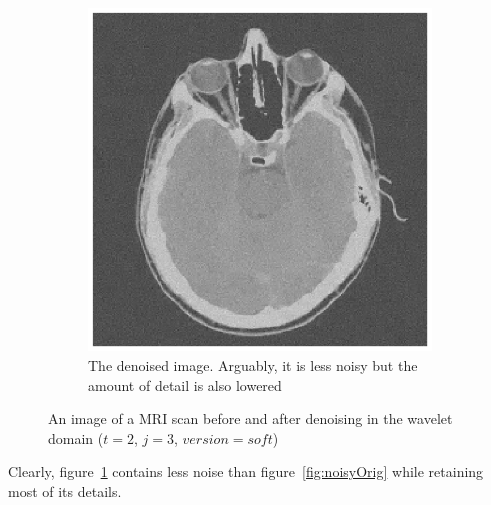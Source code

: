 \begin{figure}[htb]
\begin{subfigure}{.5\textwidth}
  \includegraphics[scale=.7]{noisyMRI_Filtered.eps}
  \caption{The denoised image. Arguably, it is less noisy but the amount of detail is also lowered}
  \label{fig:noisyDenoise}
\end{subfigure}
\caption{An image of a MRI scan before and after denoising in the wavelet domain ($t = 2$, $j = 3$, $version = soft$)}
\label{fig:noiseReductionTest}
\end{figure}

Clearly, figure~\ref{fig:noisyDenoise} contains less noise than figure~\ref{fig:noisyOrig} while retaining most of its details. 
\clearpage